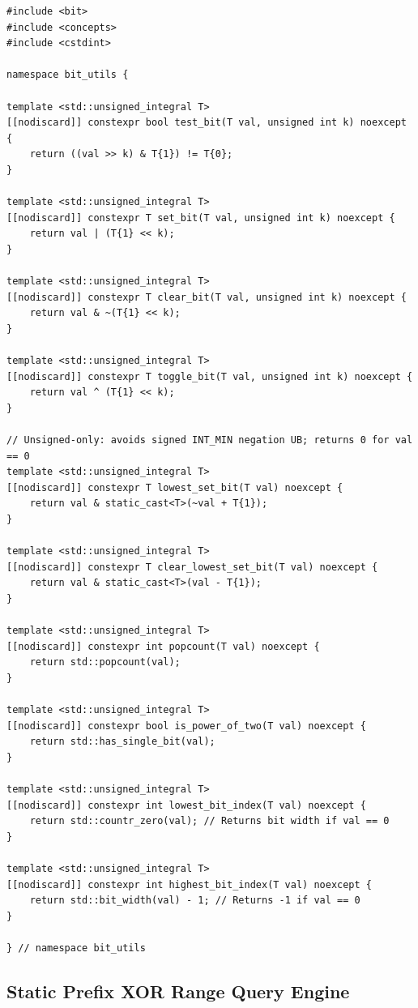 \documentclass[11pt,a4paper]{article}
\theoremstyle{definition}
\begin{document}
\begin{lstlisting}[caption={UB-free C++23 bit utilities wrapping \texttt{<bit>} and unsigned bitwise primitives}]
#include <bit>
#include <concepts>
#include <cstdint>

namespace bit_utils {

template <std::unsigned_integral T>
[[nodiscard]] constexpr bool test_bit(T val, unsigned int k) noexcept {
    return ((val >> k) & T{1}) != T{0};
}

template <std::unsigned_integral T>
[[nodiscard]] constexpr T set_bit(T val, unsigned int k) noexcept {
    return val | (T{1} << k);
}

template <std::unsigned_integral T>
[[nodiscard]] constexpr T clear_bit(T val, unsigned int k) noexcept {
    return val & ~(T{1} << k);
}

template <std::unsigned_integral T>
[[nodiscard]] constexpr T toggle_bit(T val, unsigned int k) noexcept {
    return val ^ (T{1} << k);
}

// Unsigned-only: avoids signed INT_MIN negation UB; returns 0 for val == 0
template <std::unsigned_integral T>
[[nodiscard]] constexpr T lowest_set_bit(T val) noexcept {
    return val & static_cast<T>(~val + T{1});
}

template <std::unsigned_integral T>
[[nodiscard]] constexpr T clear_lowest_set_bit(T val) noexcept {
    return val & static_cast<T>(val - T{1});
}

template <std::unsigned_integral T>
[[nodiscard]] constexpr int popcount(T val) noexcept {
    return std::popcount(val);
}

template <std::unsigned_integral T>
[[nodiscard]] constexpr bool is_power_of_two(T val) noexcept {
    return std::has_single_bit(val);
}

template <std::unsigned_integral T>
[[nodiscard]] constexpr int lowest_bit_index(T val) noexcept {
    return std::countr_zero(val); // Returns bit width if val == 0
}

template <std::unsigned_integral T>
[[nodiscard]] constexpr int highest_bit_index(T val) noexcept {
    return std::bit_width(val) - 1; // Returns -1 if val == 0
}

} // namespace bit_utils
\end{lstlisting}

\subsection{Static Prefix XOR Range Query Engine}
\end{document}
